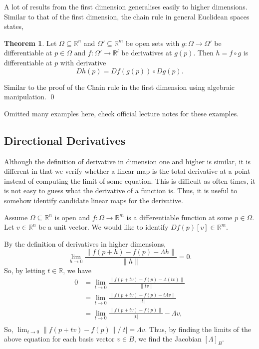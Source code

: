 \documentclass[
]{article}
\theoremstyle{definition}
\newtheorem{theorem}{Theorem}
\theoremstyle{definition}
\begin{document}
A lot of results from the first dimension generalises easily to higher
dimensions. Similar to that of the first dimension, the chain rule in
general Euclidean spaces states,

\begin{theorem}
  Let \(\Omega \subseteq \mathbb{R}^n\) and \(\Omega' \subseteq \mathbb{R}^m\) 
  be open sets with \(g : \Omega \to \Omega'\) be differentiable at \(p \in \Omega\) 
  and \(f : \Omega' \to \mathbb{R}^l\) be derivatives at \(g(p)\). Then 
  \(h = f \circ g\) is differentiable at \(p\) with derivative 
  \[Dh(p) = Df(g(p)) \circ Dg(p).\] 
\end{theorem}
\proof

Similar to the proof of the Chain rule in the first dimension using
algebraic manipulation. \qed

Omitted many examples here, check official lecture notes for these
examples.

\hypertarget{directional-derivatives}{%
\subsection{Directional Derivatives}\label{directional-derivatives}}

Although the definition of derivative in dimension one and higher is
similar, it is different in that we verify whether a linear map is the
total derivative at a point instead of computing the limit of some
equation. This is difficult as often times, it is not easy to guess what
the derivative of a function is. Thus, it is useful to somehow identify
candidate linear maps for the derivative.

Assume \(\Omega \subseteq \mathbb{R}^n\) is open and
\(f : \Omega \to \mathbb{R}^m\) is a differentiable function at some
\(p \in \Omega\). Let \(v \in \mathbb{R}^n\) be a unit vector. We would
like to identify \(Df(p)[v] \in \mathbb{R}^m\).

By the definition of derivatives in higher dimensions,
\[\lim_{h \to 0} \frac{\|f(p + h) - f(p) - \Lambda h\|}{\| h \|} = 0. \]
So, by letting \(t \in \mathbb{R}\), we have \begin{align*}
  0 & = \lim_{t \to 0} \frac{\|f(p + tv) - f(p) - \Lambda (tv)\|}{\| tv \|}\\
    & = \lim_{t \to 0} \frac{\|f(p + tv) - f(p) - t\Lambda v\|}{\left| t \right|}\\
    & = \lim_{t \to 0} \frac{\|f(p + tv) - f(p)\|}{\left|t\right|} - 
        \Lambda v,\\
\end{align*} So,
\(\lim_{t \to 0} \|f(p + tv) - f(p)\| / \left|t\right| = \Lambda v\).
Thus, by finding the limits of the above equation for each basis vector
\(v \in B\), we find the Jacobian \([\Lambda]_B\).
\end{document}
